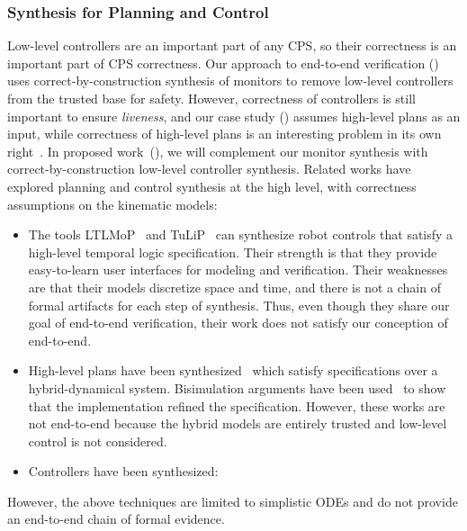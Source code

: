 \documentclass[12pt]{cmuthesis}
\theoremstyle{definition}
\theoremstyle{remark}
\newcommand{\rref}[2][]{\prettyref{#2}}
\begin{document}
\subsubsection{Synthesis for Planning and Control}
Low-level controllers are an important part of any CPS, so their correctness is an important part of CPS correctness.
Our approach to end-to-end verification (\rref{sec:veriphy}) uses correct-by-construction synthesis of monitors to remove low-level controllers from the trusted base for safety.
However, correctness of controllers is still important to ensure \emph{liveness}, and our case study (\rref{sec:ground-robotics}) assumes high-level plans as an input, while correctness of high-level plans is an interesting problem in its own right~\cite{DBLP:conf/atva/RizaldiISA18}.
In proposed work~(\rref{ch:proofplex}), we will complement our monitor synthesis with correct-by-construction low-level controller synthesis.
Related works have explored planning and control synthesis at the high level, with correctness assumptions on the kinematic models:
\begin{itemize}
\item The tools LTLMoP~\cite{DBLP:conf/iros/FinucaneJK10} and TuLiP~\cite{DBLP:conf/IEEEcca/FilippidisDLOM16} can synthesize robot controls that satisfy a high-level temporal logic specification.
Their strength is that they provide easy-to-learn user interfaces for modeling and verification.
Their weaknesses are that their models discretize space and time, and there is not a chain of formal artifacts for each step of synthesis.
Thus, even though they share our goal of end-to-end verification, their work does not satisfy our conception of end-to-end.
\item  High-level plans have been synthesized~\cite{DBLP:conf/cdc/BhatiaKV10,DBLP:journals/automatica/FainekosGKP09} which satisfy specifications over a hybrid-dynamical system.
Bisimulation arguments have been used~\cite{871304} to show that the implementation refined the specification.
However, these works are not end-to-end because the hybrid models are entirely trusted and low-level control is not considered.
\item Controllers have been synthesized:
\end{itemize}
However, the above techniques are limited to simplistic ODEs and do not provide an end-to-end chain of formal evidence.
\end{document}

